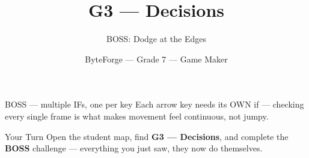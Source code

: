 \documentclass[aspectratio=169]{beamer}
\title{G3 — Decisions}
\subtitle{BOSS: Dodge at the Edges}
\author{ByteForge --- Grade 7 --- Game Maker}
\date{}
\begin{document}
\begin{frame}
    \titlepage
\end{frame}

\begin{frame}{BOSS — multiple IFs, one per key}
    \Large
    Each arrow key needs its OWN if — checking every single frame is what makes movement feel continuous, not jumpy.
\end{frame}

\begin{frame}{Your Turn}
    \Large
    Open the student map, find \textbf{G3 — Decisions}, and complete
    the \textbf{BOSS} challenge --- everything you just saw, they now do themselves.
\end{frame}
\end{document}
